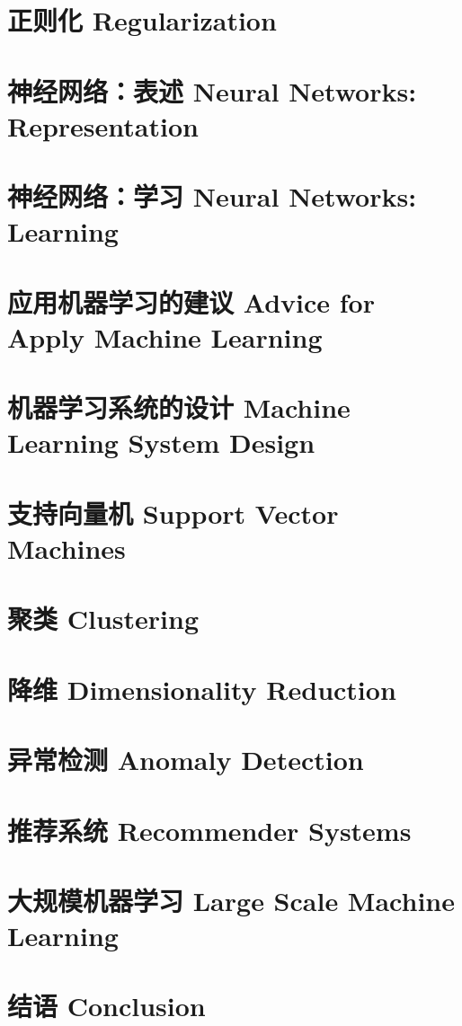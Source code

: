 \documentclass[12pt, a4paper]{article}
\begin{document}
\section{正则化 Regularization}

\section{神经网络：表述 Neural Networks: Representation}

\section{神经网络：学习 Neural Networks: Learning}

\section{应用机器学习的建议 Advice for Apply Machine Learning}

\section{机器学习系统的设计 Machine Learning System Design}

\section{支持向量机 Support Vector Machines}

\section{聚类 Clustering}

\section{降维 Dimensionality Reduction}

\section{异常检测 Anomaly Detection}

\section{推荐系统 Recommender Systems}

\section{大规模机器学习 Large Scale Machine Learning}

\section{结语 Conclusion}
\end{document}
